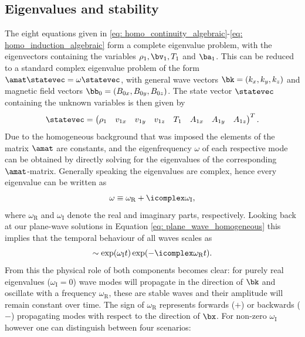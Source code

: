 \subsection{Eigenvalues and stability}
The eight equations given in \eqref{eq: homo_continuity_algebraic}-\eqref{eq: homo_induction_algebraic} form a complete eigenvalue problem, with the eigenvectors containing the variables $\rho_1, \bv_1, T_1$ and $\ba_1$. This can be reduced to a standard complex eigenvalue problem of the form $\amat\statevec = \omega\statevec$, with general wave vectors $\bk = (k_x, k_y, k_z)$ and magnetic field vectors $\bb_0 = (B_{0x}, B_{0y}, B_{0z})$. The state vector $\statevec$ containing the unknown variables is then given by
\begin{equation}
  \statevec = \begin{pmatrix}
    \rho_1 & v_{1x} & v_{1y} & v_{1z} & T_1 & A_{1x} & A_{1y} & A_{1z}
  \end{pmatrix}^T.
\end{equation}
Due to the homogeneous background that was imposed the elements of the matrix $\amat$ are constants, and the eigenfrequency $\omega$ of each respective mode can be obtained by directly solving for the eigenvalues of the corresponding $\amat$-matrix. Generally speaking the eigenvalues are complex, hence every eigenvalue can be written as
\begin{equation}
  \omega \equiv \omega_\text{R} + \icomplex\omega_\text{I},
\end{equation}
where $\omega_\text{R}$ and $\omega_\text{I}$ denote the real and imaginary parts, respectively. Looking back at our plane-wave solutions in Equation \eqref{eq: plane_wave_homogeneous} this implies that the temporal behaviour of all waves scales as
\begin{equation}
  \sim \exp(\omega_\text{I} t)\exp(-\icomplex\omega_\text{R} t).
\end{equation}
From this the physical role of both components becomes clear: for purely real eigenvalues ($\omega_\text{I} = 0$) wave modes will propagate in the direction of $\bk$ and oscillate with a frequency $\omega_\text{R}$, these are stable waves and their amplitude will remain constant over time. The sign of $\omega_\text{R}$ represents forwards ($+$) or backwards ($-$) propagating modes with respect to the direction of $\bx$. For non-zero $\omega_\text{I}$ however one can distinguish between four scenarios:
